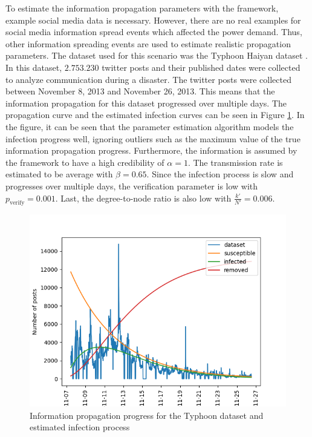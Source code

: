 To estimate the information propagation parameters with the framework,
example social media data is necessary. However, there are no real examples
for social media information spread events which affected the power demand.
Thus, other information spreading events are used to estimate 
realistic propagation parameters. The dataset used for this scenario
was the Typhoon Haiyan dataset \cite{david2016tweeting}. In this
dataset, $2.753.230$ twitter posts and their published dates were collected
to analyze communication during a disaster. The twitter posts were collected
between November 8, 2013 and November 26, 2013. This means that the 
information propagation for this dataset progressed over multiple days.
The propagation curve and the estimated infection curves can be seen in 
Figure \ref{propagationestimationtyphoon}. In the figure, it can be seen 
that the parameter estimation algorithm models the infection progress
well, ignoring outliers such as the maximum value of the true information
propagation progress. Furthermore, the
information is assumed by the framework to have a high credibility 
of $\alpha=1$. The transmission rate is estimated to be average with 
$\beta=0.65$.
Since the infection process is slow and progresses over 
multiple days, the verification parameter is
low with $p_{\mathrm{verify}}=0.001$. Last, the degree-to-node ratio
is also low with $\frac{k'}{N'}=0.006$.


\begin{figure}[!ht]
    \center
    \includegraphics[scale=.95]{figs/parameter_estimation.png}
    \caption{Information propagation progress for the Typhoon dataset 
    and estimated infection process}
    \label{propagationestimationtyphoon}
\end{figure}

